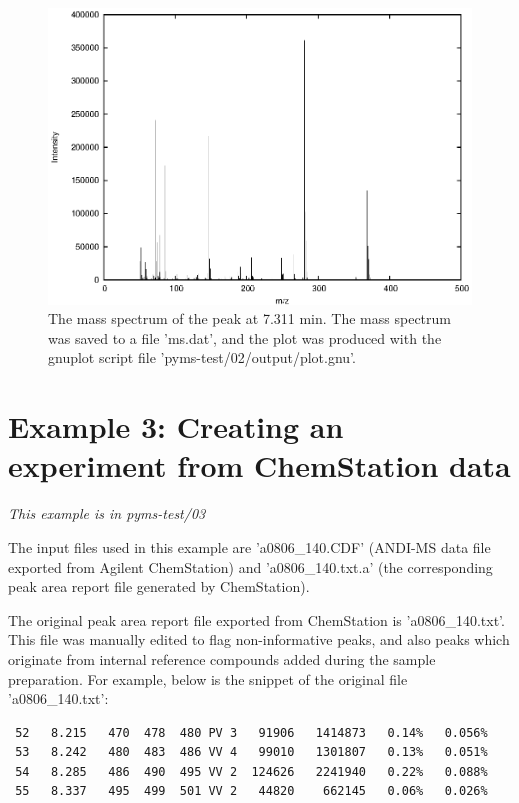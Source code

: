 \begin{figure}[htp]
\begin{center}
\includegraphics{graphics/ms.eps}
\caption{The mass spectrum of the peak at 7.311 min. The mass spectrum was
saved to a file 'ms.dat', and the plot was produced with the gnuplot script
file 'pyms-test/02/output/plot.gnu'.}
\label{fig:mass-spectrum}
\end{center}
\end{figure}

\section{Example 3: Creating an experiment from ChemStation data}

\noindent
{\em This example is in pyms-test/03}

The input files used in this example are 'a0806\_140.CDF' (ANDI-MS data
file exported from Agilent ChemStation) and 'a0806\_140.txt.a' (the 
corresponding peak area report file generated by ChemStation).

The original peak area report file exported from ChemStation is
'a0806\_140.txt'. This file was manually edited to flag non-informative
peaks, and also peaks which originate from internal reference compounds
added during the sample preparation. For example, below is the snippet
of the original file 'a0806\_140.txt':

\begin{verbatim}
 52   8.215   470  478  480 PV 3   91906   1414873   0.14%   0.056%
 53   8.242   480  483  486 VV 4   99010   1301807   0.13%   0.051%
 54   8.285   486  490  495 VV 2  124626   2241940   0.22%   0.088%
 55   8.337   495  499  501 VV 2   44820    662145   0.06%   0.026%
\end{verbatim}

